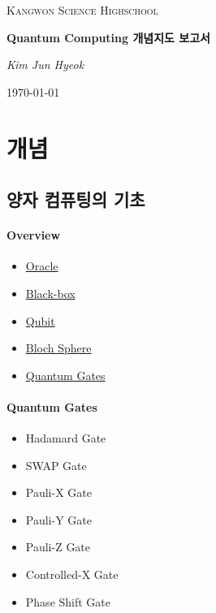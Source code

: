 \documentclass{article}
\begin{document}
    \begin{titlepage}
        \centering
	    {\scshape\LARGE Kangwon Science Highschool \par}
        \vspace{1.5cm}
	    {\huge\bfseries Quantum Computing 개념지도 보고서\par}
	    \vspace{2cm}
	    {\Large\itshape Kim Jun Hyeok\par}
	    \vfill
	    {\large \today\par}
    \end{titlepage}
    \linespread{1.5}
    \newpage
    \section{개념}
    \subsection{양자 컴퓨팅의 기초}
        \paragraph{Overview}
        \begin{itemize}
            \item \href{https://en.wikipedia.org/wiki/Oracle_machine}{Oracle} 
            \item \href{https://en.wikipedia.org/wiki/Black_box}{Black-box} 
            \item \href{https://en.wikipedia.org/wiki/Qubit}{Qubit}
            \item \href{https://en.wikipedia.org/wiki/Bloch_sphere}{Bloch Sphere}
            \item \href{https://en.wikipedia.org/wiki/Quantum_logic_gate}{Quantum Gates}
        \end{itemize}
        \paragraph{Quantum Gates}
        \begin{itemize}
            \item Hadamard Gate
            \item SWAP Gate
            \item Pauli-X Gate
            \item Pauli-Y Gate
            \item Pauli-Z Gate
            \item Controlled-X Gate
            \item Phase Shift Gate
        \end{itemize}
\end{document}
